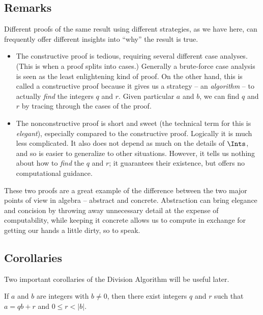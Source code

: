 \documentclass{article}
\begin{document}
\subsection*{Remarks}

Different proofs of the same result using different strategies, as we have here, can frequently offer different insights into ``why'' the result is true.
\begin{itemize}
\item The constructive proof is tedious, requiring several different case analyses. (This is when a proof splits into cases.) Generally a brute-force case analysis is seen as the least enlightening kind of proof. On the other hand, this is called a constructive proof because it gives us a strategy -- an \emph{algorithm} -- to actually \emph{find} the integers $q$ and $r$. Given particular $a$ and $b$, we can find $q$ and $r$ by tracing through the cases of the proof.

\item The nonconstructive proof is short and sweet (the technical term for this is \emph{elegant}), especially compared to the constructive proof. Logically it is much less complicated. It also does not depend as much on the details of $\Ints$, and so is easier to generalize to other situations. However, it tells us nothing about how to \emph{find} the $q$ and $r$; it guarantees their existence, but offers no computational guidance.
\end{itemize}

These two proofs are a great example of the difference between the two major points of view in algebra -- abstract and concrete. Abstraction can bring elegance and concision by throwing away unnecessary detail at the expense of computability, while keeping it concrete allows us to compute in exchange for getting our hands a little dirty, so to speak.



\subsection*{Corollaries}

Two important corollaries of the Division Algorithm will be useful later.

\begin{cor}
If $a$ and $b$ are integers with $b \neq 0$, then there exist integers $q$ and $r$ such that $a = qb + r$ and $0 \leq r < |b|$.
\end{cor}
\end{document}
